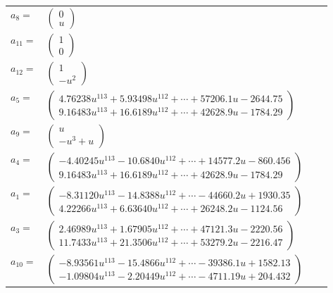 \documentclass[1p]{elsarticle_modified}
\theoremstyle{definition}
\begin{document}
\begin{tabular}{m{7pt} m{180pt} m{7pt} m{180pt} }
\flushright $a_{8}=$&$\begin{pmatrix}0\\u\end{pmatrix}$ \\
\flushright $a_{11}=$&$\begin{pmatrix}1\\0\end{pmatrix}$ \\
\flushright $a_{12}=$&$\begin{pmatrix}1\\- u^2\end{pmatrix}$ \\
\flushright $a_{5}=$&$\begin{pmatrix}4.76238 u^{113}+5.93498 u^{112}+\cdots+57206.1 u-2644.75\\9.16483 u^{113}+16.6189 u^{112}+\cdots+42628.9 u-1784.29\end{pmatrix}$ \\
\flushright $a_{9}=$&$\begin{pmatrix}u\\- u^3+u\end{pmatrix}$ \\
\flushright $a_{4}=$&$\begin{pmatrix}-4.40245 u^{113}-10.6840 u^{112}+\cdots+14577.2 u-860.456\\9.16483 u^{113}+16.6189 u^{112}+\cdots+42628.9 u-1784.29\end{pmatrix}$ \\
\flushright $a_{1}=$&$\begin{pmatrix}-8.31120 u^{113}-14.8388 u^{112}+\cdots-44660.2 u+1930.35\\4.22266 u^{113}+6.63640 u^{112}+\cdots+26248.2 u-1124.56\end{pmatrix}$ \\
\flushright $a_{3}=$&$\begin{pmatrix}2.46989 u^{113}+1.67905 u^{112}+\cdots+47121.3 u-2220.56\\11.7433 u^{113}+21.3506 u^{112}+\cdots+53279.2 u-2216.47\end{pmatrix}$ \\
\flushright $a_{10}=$&$\begin{pmatrix}-8.93561 u^{113}-15.4866 u^{112}+\cdots-39386.1 u+1582.13\\-1.09804 u^{113}-2.20449 u^{112}+\cdots-4711.19 u+204.432\end{pmatrix}$ \\

\end{tabular}
\end{document}

